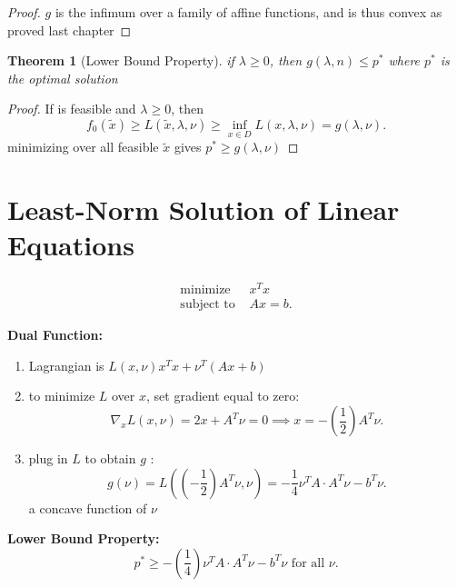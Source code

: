 \documentclass{report}
\newtheorem{theorem}{Theorem}[section]
\theoremstyle{remark} \newtheorem{remark}{Remark}[section]
\theoremstyle{definition}
\theoremstyle{definition}
\theoremstyle{definition}
\theoremstyle{remark}
\newenvironment{bthm}
  {\begin{mdframed}\begin{theorem}}
  {\end{theorem}\end{mdframed}}
\begin{document}
\begin{proof}
    $g$ is the infimum over a family of affine functions, and is thus convex as proved last chapter     
\end{proof}
 
\begin{bthm}[Lower Bound Property]
    if $\lambda \ge 0$, then $g(\lambda,n)\le p^{*}$ where $p^{*}$ is the optimal solution
\end{bthm}

\begin{proof}
If  is feasible and $\lambda\ge 0$, then
\[
f_0(\tilde{x}) \ge  L(\tilde{x},\lambda,\nu) \ge \inf_{x\in D}L(x,\lambda,\nu)=g(\lambda,\nu)
.\] 
minimizing over all feasible $\tilde{x}$ gives $p^{*}\ge g(\lambda,\nu)$ 
\end{proof}
 

\section{Least-Norm Solution of Linear Equations}

\begin{align*}
    \text{minimize } & x^{T}x \\
    \text{subject to } & Ax = b 
.\end{align*}


\textbf{Dual Function:}

\begin{enumerate}
    \item Lagrangian is $L(x,\nu) x^{T}x + \nu^{T}(Ax+b)$
         \item to minimize $L$ over $x$, set gradient equal to zero:
             \[
             \nabla_x L(x,\nu) = 2x+A^{T}\nu = 0 \implies x = -(\frac{1}{2})A^{T}\nu
             .\] 
             \item plug in $L$ to obtain $g$ :
                 \[
                 g(\nu) = L((-\frac{1}{2})A^{T}\nu,\nu)=-\frac{1}{4}\nu^{T}A\cdot A^{T}\nu-b^{T}\nu
                 .\] a concave function of $\nu$
    
\end{enumerate}

\textbf{Lower Bound Property:}
 \[
p^{*} \ge -(\frac{1}{4})\nu^{T}A\cdot A^{T}\nu - b^{T}\nu \text{ for all }\nu
.\] 
\end{document}
